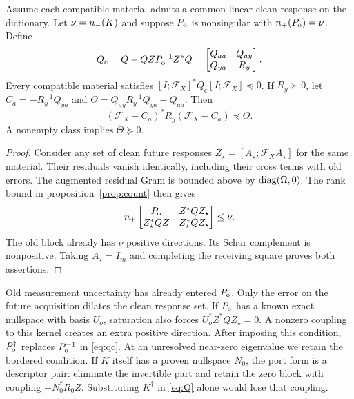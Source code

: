\begin{theorem}\label{th:response}
Assume each compatible material admits a common linear clean response on the dictionary. Let $\nu=n_-(K)$ and suppose $P_{\mathrm o}$ is nonsingular with $n_+(P_{\mathrm o})=\nu$. Define
\begin{equation}
 Q_c=Q-QZP_{\mathrm o}^{-1}Z^*Q
   =\begin{bmatrix}Q_{aa}&Q_{ay}\\Q_{ya}&R_y\end{bmatrix}.
 \label{eq:qc}
\end{equation}
Every compatible material satisfies $[I;\mathcal F_X]^* Q_c[I;\mathcal F_X]\preceq0$.
If $R_y\succ0$, let $C_a=-R_y^{-1}Q_{ya}$ and $\Theta=Q_{ay}R_y^{-1}Q_{ya}-Q_{aa}$. Then
\begin{equation}
 (\mathcal F_X-C_a)^*R_y(\mathcal F_X-C_a)\preceq\Theta .
 \label{eq:ellipse}
\end{equation}
A nonempty class implies $\Theta\succeq0$.
\end{theorem}
\begin{proof}
Consider any set of clean future responses $Z_\star=[A_\star;\mathcal F_X A_\star]$ for the same material. Their residuals vanish identically, including their cross terms with old errors. The augmented residual Gram is bounded above by $\operatorname{diag}(\Omega,0)$. The rank bound in proposition~\ref{prop:count} then gives
\begin{equation}
 n_+\begin{bmatrix}P_{\mathrm o}&Z^*Q Z_\star\\Z_\star^*QZ&Z_\star^*QZ_\star\end{bmatrix}\leq\nu .
 \label{eq:aug}
\end{equation}
The old block already has $\nu$ positive directions. Its Schur complement is nonpositive. Taking $A_\star=I_m$ and completing the receiving square proves both assertions.
\end{proof}
Old measurement uncertainty has already entered $P_{\mathrm o}$. Only the error on the future acquisition dilates the clean response set. If $P_{\mathrm o}$ has a known exact nullspace with basis $U_o$, saturation also forces $U_o^*Z^*QZ_\star=0$. A nonzero coupling to this kernel creates an extra positive direction. After imposing this condition, $P_{\mathrm o}^\dagger$ replaces $P_{\mathrm o}^{-1}$ in \eqref{eq:qc}. At an unresolved near-zero eigenvalue we retain the bordered condition. If $K$ itself has a proven nullspace $N_0$, the port form is a descriptor pair: eliminate the invertible part and retain the zero block with coupling $-N_0^*R_0 Z$. Substituting $K^\dagger$ in \eqref{eq:Q} alone would lose that coupling.

